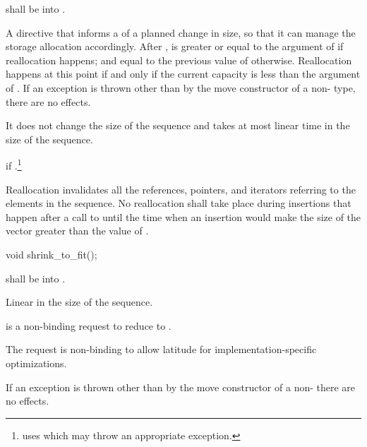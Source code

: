 \begin{itemdescr}
\pnum
\requires {} shall be  into .

\pnum
\effects
A directive that informs a
of a planned change in size, so that it can manage the storage allocation accordingly.
After
,
is greater or equal to the argument of
if reallocation happens; and equal to the previous value of
otherwise.
Reallocation happens at this point if and only if the current capacity is less than the
argument of
. If an exception is thrown
other than by the move constructor of a non- type,
there are no effects.

\pnum
\complexity
It does not change the size of the sequence and takes at most linear
time in the size of the sequence.

\pnum
\throws
{} if .\footnote{ uses  which
may throw an appropriate exception.}

\pnum
\remarks
Reallocation invalidates all the references, pointers, and iterators
referring to the elements in the sequence.
No reallocation shall take place during insertions that happen
after a call to
until the time when an insertion would make the size of the vector
greater than the value of
.
\end{itemdescr}

%
\begin{itemdecl}
void shrink_to_fit();
\end{itemdecl}

\begin{itemdescr}
\pnum
\requires {} shall be  into .

\pnum
\complexity Linear in the size of the sequence.

\pnum
\remarks {} is a non-binding request to reduce  to . \begin{note} The request is non-binding to allow latitude for implementation-specific optimizations. \end{note}
If an exception is thrown other than by the move constructor of a non-  there are no effects.
\end{itemdescr}

